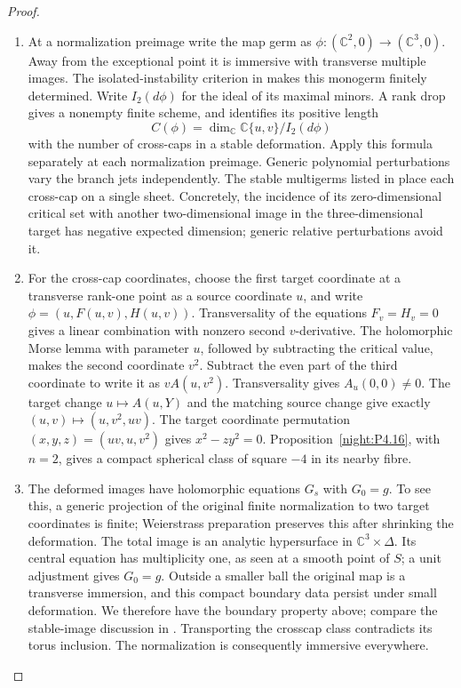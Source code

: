 \begin{proof}
\begin{enumerate}[label={$\langle1\rangle$\arabic*.},leftmargin=*]
\item At a normalization preimage write the map germ as
$\phi:(\mathbb C^2,0)\to(\mathbb C^3,0)$.
Away from the exceptional point it is immersive with transverse
multiple images. The isolated-instability criterion in
\cite[p.~5]{GCP2024} makes this monogerm finitely determined.
Write $I_2(d\phi)$ for the ideal of its maximal minors.
A rank drop gives a nonempty finite scheme, and
\cite[Lemma~2.3, p.~5]{GCP2024} identifies its positive length
\[
 C(\phi)=\dim_{\mathbb C}\mathbb C\{u,v\}/I_2(d\phi)
\]
with the number of cross-caps in a stable deformation.
Apply this formula separately at each normalization preimage.
Generic polynomial perturbations vary the branch jets independently.
The stable multigerms listed in \cite[p.~4]{GCP2024} place each
cross-cap on a single sheet. Concretely, the incidence of its
zero-dimensional critical set with another two-dimensional image
in the three-dimensional target has negative expected dimension;
generic relative perturbations avoid it.

\item For the cross-cap coordinates, choose the first target
coordinate at a transverse rank-one point as a source
coordinate $u$, and write $\phi=(u,F(u,v),H(u,v))$.
Transversality of the equations $F_v=H_v=0$ gives a linear
combination with nonzero second $v$-derivative. The
holomorphic Morse lemma with parameter $u$, followed by
subtracting the critical value, makes the second coordinate
$v^2$. Subtract the even part of the third coordinate to
write it as $vA(u,v^2)$. Transversality gives $A_u(0,0)\ne0$.
The target change $u\mapsto A(u,Y)$ and the matching source
change give exactly $(u,v)\mapsto(u,v^2,uv)$.
The target coordinate permutation $(x,y,z)=(uv,u,v^2)$ gives
$x^2-zy^2=0$. Proposition~\ref{night:P4.16}, with $n=2$,
gives a compact spherical class of square $-4$ in its nearby fibre.

\item The deformed images have holomorphic equations $G_s$ with
$G_0=g$. To see this, a generic projection of the original
finite normalization to two target coordinates is finite;
Weierstrass preparation preserves this after shrinking the
deformation. The total image is an analytic hypersurface
in $\mathbb C^3\times\Delta$. Its central equation has
multiplicity one, as seen at a smooth point of $S$; a unit
adjustment gives $G_0=g$. Outside a smaller ball the original
map is a transverse immersion, and this compact boundary
data persist under small deformation. We therefore have
the boundary property above; compare the stable-image discussion
in \cite[\S5.3, p.~33]{GCP2024}. Transporting the
crosscap class contradicts its torus inclusion. The
normalization is consequently immersive everywhere.


\end{enumerate}
\end{proof}
